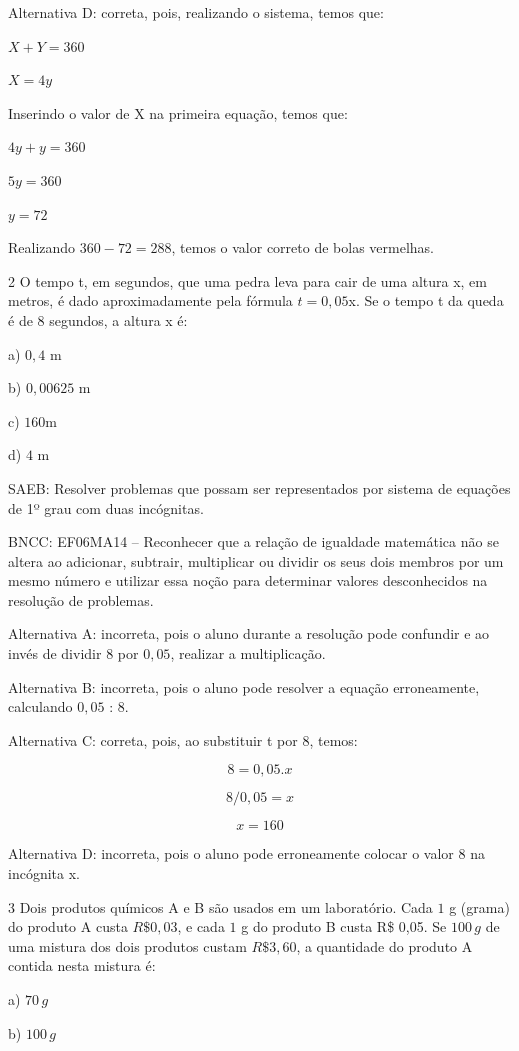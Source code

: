 Alternativa D: correta, pois, realizando o sistema, temos que:

$X + Y = 360$

$X = 4y$

Inserindo o valor de X na primeira equação, temos que:

$4y + y = 360$

$5y = 360$

$y = 72$

Realizando $360 - 72 = 288$, temos o valor correto de bolas vermelhas.

\num{2}  O tempo t, em segundos, que uma pedra leva para cair de uma altura x,
em metros, é dado aproximadamente pela fórmula $t = 0,05$x. Se o tempo t
da queda é de $8$ segundos, a altura x é:

a) $0,4$ m

b) $0,00625$ m

c) $160$m

d) $4$ m

SAEB: Resolver problemas que possam ser representados por sistema de
equações de 1º grau com duas incógnitas.

BNCC: EF06MA14 -- Reconhecer que a relação de igualdade matemática não
se altera ao adicionar, subtrair, multiplicar ou dividir os seus dois
membros por um mesmo número e utilizar essa noção para determinar
valores desconhecidos na resolução de problemas.

Alternativa A: incorreta, pois o aluno durante a resolução pode
confundir e ao invés de dividir $8$ por $0,05$, realizar a multiplicação.

Alternativa B: incorreta, pois o aluno pode resolver a equação
erroneamente, calculando $0,05$ : $8$.

Alternativa C: correta, pois, ao substituir t por $8$, temos:

$$8 = 0,05 . x$$

$$8/0,05 = x$$

$$x = 160$$

Alternativa D: incorreta, pois o aluno pode erroneamente colocar o valor
8 na incógnita x.

\num{3}  Dois produtos químicos A e B são usados em um laboratório. Cada $1$ g
(grama) do produto A custa $R\$0,03$, e cada $1$ g do produto B custa R\$
0,05. Se $100\,g$ de uma mistura dos dois produtos custam $R\$3,60$, a
quantidade do produto A contida nesta mistura é:

a) $70\,g$

b) $100\,g$

